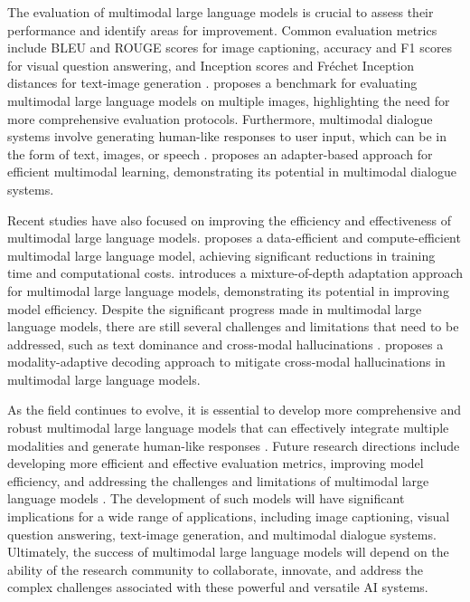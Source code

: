 \documentclass[11pt,a4paper]{article}
\begin{document}
The evaluation of multimodal large language models is crucial to assess their performance and identify areas for improvement. Common evaluation metrics include BLEU and ROUGE scores for image captioning, accuracy and F1 scores for visual question answering, and Inception scores and Fr\'{e}chet Inception distances for text-image generation \cite{arxiv:2408.08632}. \cite{arxiv:2407.15272} proposes a benchmark for evaluating multimodal large language models on multiple images, highlighting the need for more comprehensive evaluation protocols. Furthermore, multimodal dialogue systems involve generating human-like responses to user input, which can be in the form of text, images, or speech \cite{doi:10.1109/wacvw60836.2024.00106}. \cite{doi:10.1109/icassp48485.2024.10446792} proposes an adapter-based approach for efficient multimodal learning, demonstrating its potential in multimodal dialogue systems.

Recent studies have also focused on improving the efficiency and effectiveness of multimodal large language models. \cite{arxiv:2408.11795} proposes a data-efficient and compute-efficient multimodal large language model, achieving significant reductions in training time and computational costs. \cite{arxiv:2410.13859} introduces a mixture-of-depth adaptation approach for multimodal large language models, demonstrating its potential in improving model efficiency. Despite the significant progress made in multimodal large language models, there are still several challenges and limitations that need to be addressed, such as text dominance and cross-modal hallucinations \cite{arxiv:2508.10552}. \cite{arxiv:2601.21181} proposes a modality-adaptive decoding approach to mitigate cross-modal hallucinations in multimodal large language models.

As the field continues to evolve, it is essential to develop more comprehensive and robust multimodal large language models that can effectively integrate multiple modalities and generate human-like responses \cite{doi:10.1093/nsr/nwae403}. Future research directions include developing more efficient and effective evaluation metrics, improving model efficiency, and addressing the challenges and limitations of multimodal large language models \cite{arxiv:2409.18991}. The development of such models will have significant implications for a wide range of applications, including image captioning, visual question answering, text-image generation, and multimodal dialogue systems. Ultimately, the success of multimodal large language models will depend on the ability of the research community to collaborate, innovate, and address the complex challenges associated with these powerful and versatile AI systems.
\end{document}
